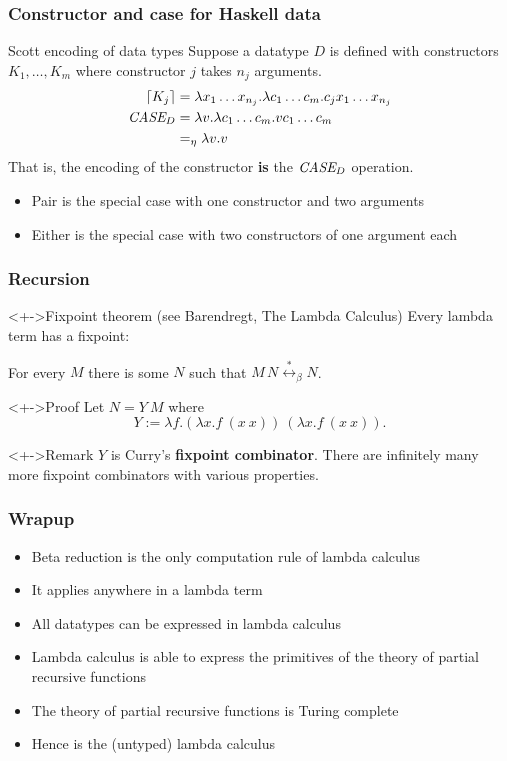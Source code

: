 \documentclass[pdftex,aspectratio=169]{beamer}
\begin{document}
\begin{frame}
  \frametitle{Constructor and case for Haskell data}
  \begin{block}{Scott encoding of data types}
    Suppose a datatype $D$ is defined with constructors
    $K_1, \dots, K_m$ where constructor $j$ takes $n_j$ arguments.
    \begin{align*}
      \lceil K_j\rceil &= \lambda x_1 \dots x_{n_j}. \lambda c_1 \dots
                     c_m. c_j x_1 \dots x_{n_j}
      \\
      \textit{CASE}_D &= \lambda v. \lambda c_1 \dots c_m. v c_1 \dots c_m
      \\
                   &=_\eta \lambda v.v
    \end{align*}
    That is, the encoding of the constructor \textbf{is} the $\textit{CASE}_D$
    operation.
    \begin{itemize}
    \item Pair is the special case with one constructor and two
      arguments
    \item Either is the special case with two constructors of one
      argument each
    \end{itemize}
  \end{block}
\end{frame}

\begin{frame}
  \frametitle{Recursion}
  \begin{alertblock}<+->{Fixpoint theorem (see Barendregt, The Lambda Calculus)}
    Every lambda term has a fixpoint:

    For every $M$ there is some $N$ such that
    $
    M\, N \overset{\ast}{\leftrightarrow}_\beta N
    $.
  \end{alertblock}
  \begin{exampleblock}<+->{Proof}
    Let $N = Y~M$ where
    \begin{displaymath}
      Y := \lambda f.(\lambda x.f~(x~x))~(\lambda x.f~(x~x)).
    \end{displaymath}
  \end{exampleblock}
  \begin{block}<+->{Remark}
    $Y$ is Curry's \textbf{fixpoint combinator}. There are infinitely
    many more fixpoint combinators with various properties.
  \end{block}
\end{frame}
\begin{frame}
  \frametitle{Wrapup}
  \begin{itemize}
  \item Beta reduction is the only computation rule of lambda calculus
  \item It applies anywhere in a lambda term
  \item All datatypes can be expressed in lambda calculus
  \item Lambda calculus is able to express the primitives of the
    theory of partial recursive functions
  \item The theory of partial recursive functions is Turing complete
  \item Hence is the (untyped) lambda calculus
  \end{itemize}
\end{frame}
\end{document}
